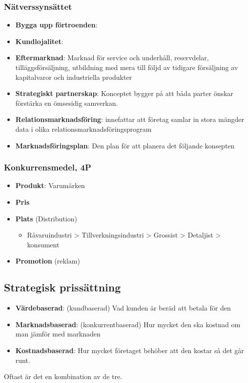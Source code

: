 \begin{multicols}{2}
\subsubsection{Nätverssynsättet}
\begin{itemize}
    \item \textbf{Bygga upp förtroenden}:
    \item \textbf{Kundlojalitet}:
    \item \textbf{Eftermarknad}: \newline
    Marknad för service och underhåll, reservdelar, tilläggsförsäljning, utbildning 
    med mera till följd av tidigare försäljning av kapitalvaror och industriella produkter
    \item \textbf{Strategiskt partnerskap}: \newline
    Konceptet bygger på att båda parter önskar förstärka en ömsesidig samverkan.
    \item \textbf{Relationsmarknadsföring}: \newline
    innefattar att företag samlar in stora mängder data i olika 
    relationsmarknadsföringsprogram
    \item \textbf{Marknadsföringsplan}: \newline
    Den plan för att planera det följande konsepten
\end{itemize}

\subsubsection{Konkurrensmedel, 4P}
\begin{itemize}
    \item \textbf{Produkt}: Varumärken
    \item \textbf{Pris} 
    \item \textbf{Plats} (Distribution)
    \begin{itemize}
        \item Råvaruindustri > Tillverkningsindustri > Grossist > Detaljist > konsument
    \end{itemize}
    \item \textbf{Promotion} (reklam)
\end{itemize}

\subsection{Strategisk prissättning}
\begin{itemize}
    \item \textbf{Värdebaserad}: (kundbaserad) \newline
    Vad kunden är beräd att betala för den
    \item \textbf{Marknadsbaserad}: (konkurrentbaserad) \newline
    Hur mycket den ska kostnad om man jämför med marknaden
    \item \textbf{Kostnadsbaserad}: \newline
    Hur mycket företaget behöber att den kostar så det går runt.
\end{itemize}
Oftast är det en kombination av de tre.


\end{multicols}
